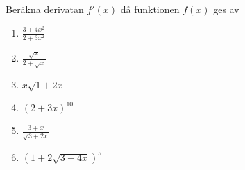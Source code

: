 

Beräkna derivatan $f'(x)$ då funktionen $f(x)$ ges av
\begin{enumerate}
\item $ \frac{3+4x^2}{2+3x^2} $
\item $ \frac{\sqrt{x}}{2+\sqrt{x}} $
\item $ x\sqrt{1+2x} $
\item $ (2+3x)^{10} $
\item $ \frac{3+x}{\sqrt{3+2x}} $
\item $ (1+2\sqrt{3+4x})^5 $
\end{enumerate}